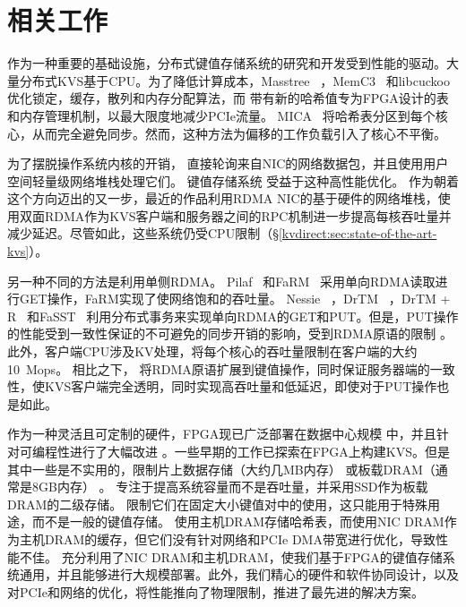 \section{相关工作}
\label{kvdirect:sec:related}

作为一种重要的基础设施，分布式键值存储系统的研究和开发受到性能的驱动。大量分布式KVS基于CPU。为了降低计算成本，Masstree~ \cite {mao2012cache}，MemC3~ \cite {fan2013memc3}和libcuckoo~ \cite {li2014algorithmic}优化锁定，缓存，散列和内存分配算法，而 \oursys{} 带有新的哈希值专为FPGA设计的表和内存管理机制，以最大限度地减少PCIe流量。 MICA~ \cite {lim2014mica}将哈希表分区到每个核心，从而完全避免同步。然而，这种方法为偏移的工作负载引入了核心不平衡。

为了摆脱操作系统内核的开销， \cite {rizzo2012netmap,intel2014data}直接轮询来自NIC的网络数据包，并且\cite {jeong2014mtcp,marinos2014network}使用用户空间轻量级网络堆栈处理它们。
键值存储系统 \cite {kapoor2012chronos,ousterhout2010case,ousterhout2015ramcloud,lim2014mica,li2016full}受益于这种高性能优化。
作为朝着这个方向迈出的又一步，最近的作品\cite {infiniband2000infiniband,kalia2014using,kalia2016design,kalia2014using,kalia2016design}利用RDMA NIC的基于硬件的网络堆栈，使用双面RDMA作为KVS客户端和服务器之间的RPC机制进一步提高每核吞吐量并减少延迟。尽管如此，这些系统仍受CPU限制（\S \ref {kvdirect:sec:state-of-the-art-kvs}）。

另一种不同的方法是利用单侧RDMA。 Pilaf~ \cite {mitchell2013using}和FaRM~ \cite {dragojevic2014farm}采用单向RDMA读取进行GET操作，FaRM实现了使网络饱和的吞吐量。 Nessie~ \cite {szepesi2014designing}，DrTM~ \cite {wei2015fast}，DrTM + R~ \cite {chen2016fast}和FaSST~ \cite {kalia2016fasst}利用分布式事务来实现单向RDMA的GET和PUT。但是，PUT操作的性能受到一致性保证的不可避免的同步开销的影响，受到RDMA原语的限制 \cite {kalia2016design}。此外，客户端CPU涉及KV处理，将每个核心的吞吐量限制在客户端的大约10~Mops。
相比之下，\oursys{} 将RDMA原语扩展到键值操作，同时保证服务器端的一致性，使KVS客户端完全透明，同时实现高吞吐量和低延迟，即使对于PUT操作也是如此。

作为一种灵活且可定制的硬件，FPGA现已广泛部署在数据中心规模 \cite {putnam2014reconfigurable,caulfield2016cloud}中，并且针对可编程性进行了大幅改进 \cite {bacon2013fpga,li2016clicknp}。一些早期的工作已探索在FPGA上构建KVS。但是其中一些是不实用的，限制片上数据存储（大约几MB内存） \cite {liang16fpl}或板载DRAM（通常是8GB内存） \cite {istvan2013flexible,chalamalasetti2013fpga,istvan2015hash}。
 \cite {blott2015scaling}专注于提高系统容量而不是吞吐量，并采用SSD作为板载DRAM的二级存储。
 \cite {liang16fpl,chalamalasetti2013fpga}限制它们在固定大小键值对中的使用，这只能用于特殊用途，而不是一般的键值存储。
\cite {blott13hotcloud,lavasani2014fpga}使用主机DRAM存储哈希表，而\cite {tokusashi2016multilevel}使用NIC DRAM作为主机DRAM的缓存，但它们没有针对网络和PCIe DMA带宽进行优化，导致性能不佳。
\oursys{} 充分利用了NIC DRAM和主机DRAM，使我们基于FPGA的键值存储系统通用，并且能够进行大规模部署。此外，我们精心的硬件和软件协同设计，以及对PCIe和网络的优化，将性能推向了物理限制，推进了最先进的解决方案。

